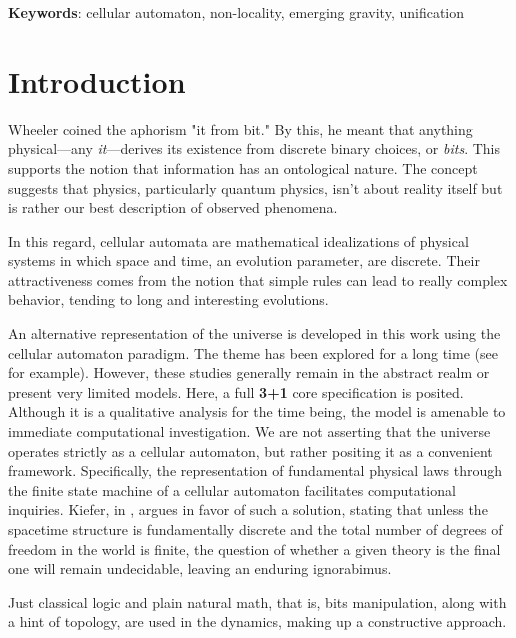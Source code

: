 \documentclass[12pt,english]{article}
\begin{document}
\begin{center}
\textbf{Keywords}: cellular automaton, non-locality, emerging gravity, unification
\par\end{center}

\newpage


\section{Introduction}

Wheeler \cite{wheeler} coined the aphorism "it from bit." By this, he meant that anything physical—any \emph{it}—derives its existence from discrete binary choices, or \emph{bits}. This supports the notion that information has an ontological nature. The concept suggests that physics, particularly quantum physics, isn't about reality itself but is rather our best description of observed phenomena.

In this regard, cellular automata are mathematical idealizations of physical systems in which space and time, an evolution parameter, are discrete. Their attractiveness comes from the notion that simple rules can lead to really complex behavior, tending to long and interesting evolutions.

An alternative representation of the universe is developed in this work using the cellular automaton paradigm. The theme has been explored for a long time (see \cite{zuse,feynman,gardner,margolus,wolfram,fredkin,elze,Elze2019,sciarretta,thooft} for example). However, these studies generally remain in the abstract realm or present very limited models. Here, a full \textbf{3+1} core specification is posited. Although it is a qualitative analysis for the time being, the model is amenable to immediate computational investigation. We are not asserting that the universe operates strictly as a cellular automaton, but rather positing it as a convenient framework. Specifically, the representation of fundamental physical laws through the finite state machine of a cellular automaton facilitates computational inquiries. Kiefer, in \cite{kiefer2024goedel}, argues in favor of such a solution, stating that unless the spacetime structure is fundamentally discrete and the total number of degrees of freedom in the world is finite, the question of whether a given theory is the final one will remain undecidable, leaving an enduring ignorabimus.

Just classical logic and plain natural math, that is, bits manipulation, along with a hint of topology, are used in the dynamics, making up a constructive approach.
\end{document}
